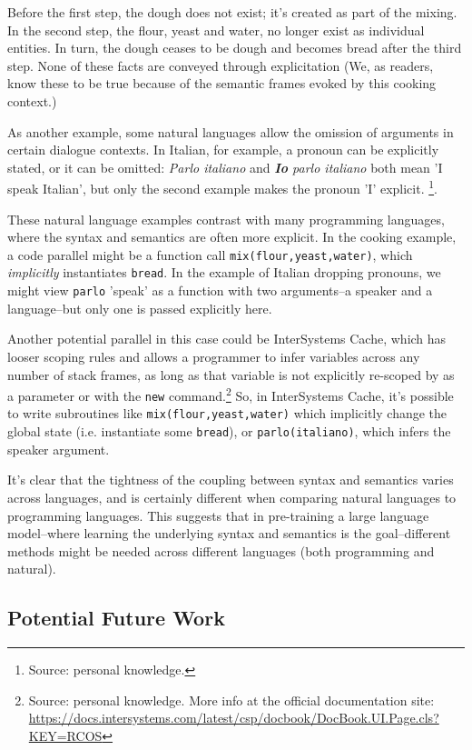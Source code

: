 \documentclass[acmlarge]{acmart}
\begin{document}
Before the first step, the dough does not exist; it's created as part of the mixing. In the second step, the flour, yeast and water, no longer exist as individual entities. In turn, the dough ceases to be dough and becomes bread after the third step. None of these facts are conveyed through explicitation (We, as readers, know these to be true because of the semantic frames evoked by this cooking context.)

As another example, some natural languages allow the omission of arguments in certain dialogue contexts. In Italian, for example, a pronoun can be explicitly stated, or it can be omitted:  \emph{Parlo italiano} and \emph{\textbf{Io} parlo italiano} both mean 'I speak Italian', but only the second example makes the pronoun 'I' explicit. \footnote{Source: personal knowledge.}.  

These natural language examples contrast with many programming languages, where the syntax and semantics are often more explicit. In the cooking example, a code parallel might be a function call \texttt{mix(flour,yeast,water)}, which \emph{implicitly} instantiates \texttt{bread}.  In the example of Italian dropping pronouns, we might view \texttt{parlo} 'speak' as a function with two arguments--a speaker and a language--but only one is passed explicitly here. 

Another potential parallel in this case could be InterSystems Cache, which has looser scoping rules and allows a programmer to infer variables across any number of stack frames, as long as that variable is not explicitly re-scoped by as a parameter or with the \texttt{new} command.\footnote{Source: personal knowledge. More info at the official documentation site: \url{https://docs.intersystems.com/latest/csp/docbook/DocBook.UI.Page.cls?KEY=RCOS}} So, in InterSystems Cache, it's possible to write subroutines like \texttt{mix(flour,yeast,water)} which implicitly change the global state (i.e. instantiate some \texttt{bread}), or \texttt{parlo(italiano)}, which infers the speaker argument.

It's clear that the tightness of the coupling between syntax and semantics varies across languages, and is certainly different when comparing natural languages to programming languages. This suggests that in pre-training a large language model--where learning the underlying syntax and semantics is the goal--different methods might be needed across different languages (both programming and natural).


\subsection{Potential Future Work}
\end{document}
